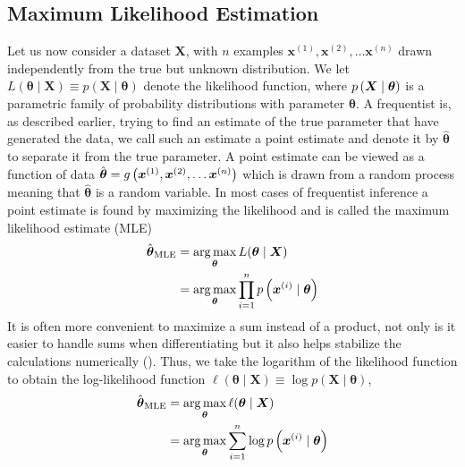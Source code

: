 \subsection{Maximum Likelihood Estimation} \label{sec:mle}
Let us now consider a dataset $\boldsymbol{X}$, with $n$ examples $\boldsymbol{x}^{(1)}, \boldsymbol{x}^{(2)},\ldots \boldsymbol{x}^{(n)}$ drawn independently from the true but unknown distribution. We let
$L(\boldsymbol{\theta}\mid \boldsymbol{X})\equiv p(\boldsymbol{X}\mid \boldsymbol{\theta})$ denote the likelihood function, where $p\left (\boldsymbol{X}\mid\boldsymbol{\theta}\right)$ is a parametric family of probability distributions with parameter $\boldsymbol{\theta}$. A frequentist is, as described earlier, trying to find an estimate of the true parameter that have generated the data, we call such an estimate a point estimate and denote it by $\hat{\boldsymbol{\theta}}$ to separate it from the true parameter. A point estimate can be viewed as a function of data $\hat{\boldsymbol{\theta}}=g\left (\boldsymbol{x}^{(1)}, \boldsymbol{x}^{(2)},\ldots \boldsymbol{x}^{(n)}\right)$ which is drawn from a random process meaning that $\hat{\boldsymbol{\theta}}$ is a random variable.
In most cases of frequentist inference a point estimate is found by maximizing the likelihood and is called the maximum likelihood estimate (MLE)
\begin{equation*}
\begin{split}
       \hat{\boldsymbol{\theta}}_{\text{MLE}}&=\operatorname*{arg\,max}_{\boldsymbol{\theta}}{L(\boldsymbol{\theta}\mid \boldsymbol{X})}\\
        & = \operatorname*{arg\,max}_{\boldsymbol{\theta}}{\prod^n_{i=1}p\left (\boldsymbol{x}^{(i)}\mid \boldsymbol{\theta}\right)}
\end{split}
\end{equation*}
It is often more convenient to maximize a sum instead of a product, not only is it easier to handle sums when differentiating but it also helps stabilize the calculations numerically (\cite{Goodfellow-et-al-2016}). Thus, we take the logarithm of the likelihood function to obtain the log-likelihood function $\ell(\boldsymbol{\theta}\mid \boldsymbol{X})\equiv \log{p(\boldsymbol{X}\mid \boldsymbol{\theta})}$,
\begin{equation*}
\begin{split}
       \hat{\boldsymbol{\theta}}_{\text{MLE}}&=\operatorname*{arg\,max}_{\boldsymbol{\theta}}{\ell(\boldsymbol{\theta}\mid \boldsymbol{X})}\\
        &=\operatorname*{arg\,max}_{\boldsymbol{\theta}}{\sum^n_{i=1}\log{p\left (\boldsymbol{x}^{(i)}\mid\boldsymbol{\theta}\right)}}
\end{split}
\end{equation*}
